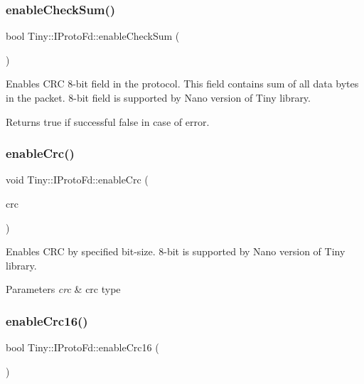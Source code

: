 \subsubsection{\texorpdfstring{enable\+Check\+Sum()}{enableCheckSum()}}
{\footnotesize\ttfamily bool Tiny\+::\+I\+Proto\+Fd\+::enable\+Check\+Sum (\begin{DoxyParamCaption}{ }\end{DoxyParamCaption})}

Enables C\+RC 8-\/bit field in the protocol. This field contains sum of all data bytes in the packet. 8-\/bit field is supported by Nano version of Tiny library. \begin{DoxyReturn}{Returns}
true if successful false in case of error. 
\end{DoxyReturn}
\mbox{\label{classTiny_1_1IProtoFd_a7dec2906051505034e91b503318a5563}} 
\subsubsection{\texorpdfstring{enable\+Crc()}{enableCrc()}}
{\footnotesize\ttfamily void Tiny\+::\+I\+Proto\+Fd\+::enable\+Crc (\begin{DoxyParamCaption}\item[{\hyperlink{group__HDLC__API_gabb73b32d08d8e79eefe9385634a74bf7}{hdlc\+\_\+crc\+\_\+t}}]{crc }\end{DoxyParamCaption})}

Enables C\+RC by specified bit-\/size. 8-\/bit is supported by Nano version of Tiny library. 
\begin{DoxyParams}{Parameters}
{\em crc} & crc type \\
\hline
\end{DoxyParams}
\mbox{\label{classTiny_1_1IProtoFd_a8b57afdb66434aa35409af34b04e1db9}} 
\subsubsection{\texorpdfstring{enable\+Crc16()}{enableCrc16()}}
{\footnotesize\ttfamily bool Tiny\+::\+I\+Proto\+Fd\+::enable\+Crc16 (\begin{DoxyParamCaption}{ }\end{DoxyParamCaption})}

